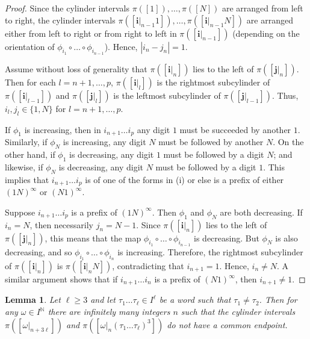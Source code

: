 \documentclass[11pt]{amsart}
\newcommand\NN{\mathbb{N}}
\newcommand{\1}{1}
\newtheorem{lemma}[theorem]{Lemma}
\begin{document}
\begin{proof}
Since the cylinder intervals $\pi([1]),\dots,\pi([N])$ are arranged from left to right, the cylinder intervals $\pi([\mathbf{i}|_{n-1}1]),\dots,\pi([\mathbf{i}|_{n-1}N])$ are arranged either from left to right or from right to left in $\pi([\mathbf{i}|_{n-1}])$ (depending on the orientation of $\phi_{i_1}\circ\dots\circ\phi_{i_{n-1}}$). Hence, $|i_n-j_n|=1$.

Assume without loss of generality that $\pi([\mathbf{i}|_n])$ lies to the left of $\pi([\mathbf{j}|_n])$. Then for each $l=n+1,\dots,p$, $\pi([\mathbf{i}|_l])$ is the rightmost subcylinder of $\pi([\mathbf{i}|_{l-1}])$ and $\pi([\mathbf{j}|_l])$ is the leftmost subcylinder of $\pi([\mathbf{j}|_{l-1}])$.
Thus, $i_l,j_l\in\{1,N\}$ for $l=n+1,\dots,p$.

If $\phi_1$ is increasing, then in $i_{n+1}\dots i_p$ any digit $1$ must be succeeded by another $1$. Similarly, if $\phi_N$ is increasing, any digit $N$ must be followed by another $N$. On the other hand, if $\phi_1$ is decreasing, any digit $1$ must be followed by a digit $N$; and likewise, if $\phi_N$ is decreasing, any digit $N$ must be followed by a digit $1$. This implies that $i_{n+1}\dots i_p$ is of one of the forms in (i) or else is a prefix of either $(1N)^\infty$ or $(N1)^\infty$. %

Suppose $i_{n+1}\dots i_p$ is a prefix of $(1N)^\infty$. Then $\phi_1$ and $\phi_N$ are both decreasing. If $i_n=N$, then necessarily $j_n=N-1$. Since $\pi([\mathbf{i}|_n])$ lies to the left of $\pi([\mathbf{j}|_n])$, this means that the map $\phi_{i_1}\circ\dots\circ\phi_{i_{n-1}}$ is decreasing. But $\phi_N$ is also decreasing, and so $\phi_{i_1}\circ\dots\circ\phi_{i_n}$ is increasing. Therefore, the rightmost subcylinder of $\pi([\mathbf{i}|_{n}])$ is $\pi([\mathbf{i}|_n N])$, contradicting that $i_{n+1}=1$. Hence, $i_n\neq N$. A similar argument shows that if $i_{n+1}\dots i_n$ is a prefix of $(N1)^\infty$, then $i_{n+1}\neq 1$.
\end{proof}

\begin{lemma} \label{lem:non-adjacency}
Let {$\ell\geq 3$} and let $\tau_1\dots\tau_\ell\in I^\ell$ be a word such that $\tau_1\neq\tau_2$. Then for any $\omega\in I^\NN$ there are infinitely many integers $n$ such that the cylinder intervals $\pi([\omega|_{n+3\ell}])$ and $\pi([\omega|_{n}(\tau_1\dots\tau_\ell)^3])$ do not have a common endpoint.
\end{lemma}
\end{document}
